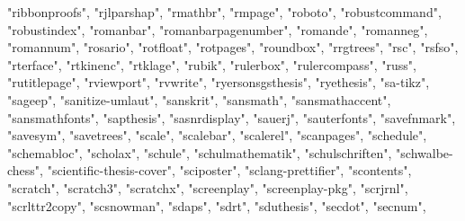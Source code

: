 \documentclass[
]{article}
\newenvironment{Shaded}{\begin{snugshade}}{\end{snugshade}}
\newcommand{\NormalTok}[1]{#1}
\newcommand{\StringTok}[1]{\textcolor[rgb]{0.31,0.60,0.02}{#1}}
\begin{document}
\begin{Shaded}
\begin{Highlighting}[]
\StringTok{"ribbonproofs"}\NormalTok{, }\StringTok{"rjlparshap"}\NormalTok{, }\StringTok{"rmathbr"}\NormalTok{, }\StringTok{"rmpage"}\NormalTok{, }\StringTok{"roboto"}\NormalTok{, }
\StringTok{"robustcommand"}\NormalTok{, }\StringTok{"robustindex"}\NormalTok{, }\StringTok{"romanbar"}\NormalTok{, }\StringTok{"romanbarpagenumber"}\NormalTok{, }
\StringTok{"romande"}\NormalTok{, }\StringTok{"romanneg"}\NormalTok{, }\StringTok{"romannum"}\NormalTok{, }\StringTok{"rosario"}\NormalTok{, }\StringTok{"rotfloat"}\NormalTok{, }\StringTok{"rotpages"}\NormalTok{, }
\StringTok{"roundbox"}\NormalTok{, }\StringTok{"rrgtrees"}\NormalTok{, }\StringTok{"rsc"}\NormalTok{, }\StringTok{"rsfso"}\NormalTok{, }\StringTok{"rterface"}\NormalTok{, }\StringTok{"rtkinenc"}\NormalTok{, }
\StringTok{"rtklage"}\NormalTok{, }\StringTok{"rubik"}\NormalTok{, }\StringTok{"rulerbox"}\NormalTok{, }\StringTok{"rulercompass"}\NormalTok{, }\StringTok{"russ"}\NormalTok{, }\StringTok{"rutitlepage"}\NormalTok{, }
\StringTok{"rviewport"}\NormalTok{, }\StringTok{"rvwrite"}\NormalTok{, }\StringTok{"ryersonsgsthesis"}\NormalTok{, }\StringTok{"ryethesis"}\NormalTok{, }\StringTok{"sa{-}tikz"}\NormalTok{, }
\StringTok{"sageep"}\NormalTok{, }\StringTok{"sanitize{-}umlaut"}\NormalTok{, }\StringTok{"sanskrit"}\NormalTok{, }\StringTok{"sansmath"}\NormalTok{, }\StringTok{"sansmathaccent"}\NormalTok{, }
\StringTok{"sansmathfonts"}\NormalTok{, }\StringTok{"sapthesis"}\NormalTok{, }\StringTok{"sasnrdisplay"}\NormalTok{, }\StringTok{"sauerj"}\NormalTok{, }\StringTok{"sauterfonts"}\NormalTok{, }
\StringTok{"savefnmark"}\NormalTok{, }\StringTok{"savesym"}\NormalTok{, }\StringTok{"savetrees"}\NormalTok{, }\StringTok{"scale"}\NormalTok{, }\StringTok{"scalebar"}\NormalTok{, }\StringTok{"scalerel"}\NormalTok{, }
\StringTok{"scanpages"}\NormalTok{, }\StringTok{"schedule"}\NormalTok{, }\StringTok{"schemabloc"}\NormalTok{, }\StringTok{"scholax"}\NormalTok{, }\StringTok{"schule"}\NormalTok{, }\StringTok{"schulmathematik"}\NormalTok{, }
\StringTok{"schulschriften"}\NormalTok{, }\StringTok{"schwalbe{-}chess"}\NormalTok{, }\StringTok{"scientific{-}thesis{-}cover"}\NormalTok{, }
\StringTok{"sciposter"}\NormalTok{, }\StringTok{"sclang{-}prettifier"}\NormalTok{, }\StringTok{"scontents"}\NormalTok{, }\StringTok{"scratch"}\NormalTok{, }\StringTok{"scratch3"}\NormalTok{, }
\StringTok{"scratchx"}\NormalTok{, }\StringTok{"screenplay"}\NormalTok{, }\StringTok{"screenplay{-}pkg"}\NormalTok{, }\StringTok{"scrjrnl"}\NormalTok{, }\StringTok{"scrlttr2copy"}\NormalTok{, }
\StringTok{"scsnowman"}\NormalTok{, }\StringTok{"sdaps"}\NormalTok{, }\StringTok{"sdrt"}\NormalTok{, }\StringTok{"sduthesis"}\NormalTok{, }\StringTok{"secdot"}\NormalTok{, }\StringTok{"secnum"}\NormalTok{, }

\end{Highlighting}
\end{Shaded}
\end{document}
